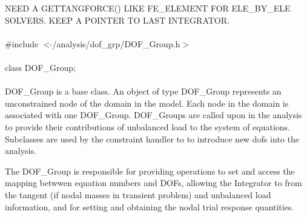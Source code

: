 
NEED A GETTANGFORCE() LIKE FE\_ELEMENT FOR ELE\_BY\_ELE SOLVERS. KEEP A
POINTER TO LAST INTEGRATOR. \\

   \\
\indent \#include $<\tilde{ }$/analysis/dof\_grp/DOF\_Group.h$>$  \\

  \\
\indent class DOF\_Group;  \\

  \\
\indent DOF\_Group is a base class. An object of type DOF\_Group
represents an unconstrained node of the domain in the model. Each node
in the domain is associated with one DOF\_Group. DOF\_Groups are
called upon in the analysis to provide their contributions of
unbalanced load to the system of equations. Subclasses are used by the
constraint handler to to introduce new dofs into the analysis. 

The DOF\_Group is responsible for providing operations to set and
access the mapping betwwen equation numbers and DOFs, allowing the
Integrator to from the tangent (if nodal masses in transient problem)
and unbalanced load information, and for setting and obtaining the
nodal trial response quantities. \\


